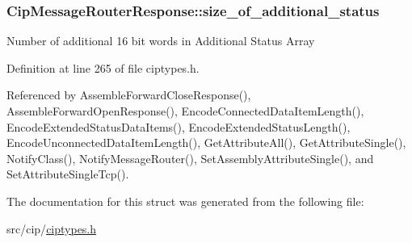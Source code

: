 \hypertarget{structCipMessageRouterResponse_a1b89b9d5962ad72516fb1c413857993a}{
\subsubsection[{size\-\_\-of\-\_\-additional\-\_\-status}]{ {\bf \-Cip\-Message\-Router\-Response\-::size\-\_\-of\-\_\-additional\-\_\-status}}}\label{d0/d1f/structCipMessageRouterResponse_a1b89b9d5962ad72516fb1c413857993a}
\-Number of additional 16 bit words in \-Additional \-Status \-Array 

\-Definition at line 265 of file ciptypes.\-h.



\-Referenced by \-Assemble\-Forward\-Close\-Response(), \-Assemble\-Forward\-Open\-Response(), \-Encode\-Connected\-Data\-Item\-Length(), \-Encode\-Extended\-Status\-Data\-Items(), \-Encode\-Extended\-Status\-Length(), \-Encode\-Unconnected\-Data\-Item\-Length(), \-Get\-Attribute\-All(), \-Get\-Attribute\-Single(), \-Notify\-Class(), \-Notify\-Message\-Router(), \-Set\-Assembly\-Attribute\-Single(), and \-Set\-Attribute\-Single\-Tcp().



\-The documentation for this struct was generated from the following file\-:\begin{DoxyCompactItemize}
\item 
src/cip/\hyperlink{ciptypes_8h}{ciptypes.\-h}\end{DoxyCompactItemize}
